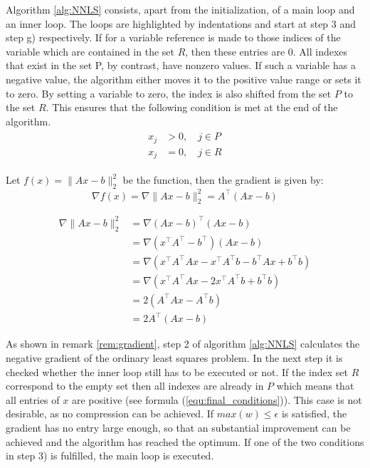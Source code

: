 Algorithm \ref{alg:NNLS} consists, apart from the initialization, of a main loop and an inner loop. The loops are highlighted by indentations and start at step 3 and step g) respectively. If for a variable reference is made to those indices of the variable which are contained in the set $R$, then these entries are 0. All indexes that exist in the set P, by contrast, have nonzero values. If such a variable has a negative value, the algorithm either moves it to the positive value range or sets it to zero. By setting a variable to zero, the index is also shifted from the set $P$ to the set $R$. This ensures that the following condition is met at the end of the algorithm.   
\begin{align}\label{equ:final_conditions}
\begin{split}
	x_j &> 0, \quad j \in P \\
	x_j &= 0, \quad j \in R
\end{split}
\end{align}



\begin{remark}\label{rem:gradient}
	Let $f(x) = \lVert Ax -b \rVert_2^2$ be the function, then the gradient is given by: 
	\begin{equation*}
		\nabla f(x) = \nabla \lVert Ax -b \rVert_2^2 = A^\top(Ax-b)
	\end{equation*}
	
	\begin{align*}
		\nabla \lVert Ax -b \rVert_2^2	&= \nabla (Ax-b)^\top (Ax-b) \\
										&= \nabla (x^\top A^\top - b^\top)(Ax-b) \\
										&= \nabla (x^\top A^\top Ax - x^\top A^\top b - b^\top Ax + b^\top b) \\
										&= \nabla (x^\top A^\top Ax - 2x^\top A^\top b + b^\top b) \\
										&= 2 (A^\top A x - A^\top b) \\
										&= 2A^\top (Ax - b)
	\end{align*}
\end{remark}

As shown in remark \ref{rem:gradient}, step 2 of algorithm \ref{alg:NNLS} calculates the negative gradient of the ordinary least squares problem. In the next step it is checked whether the inner loop still has to be executed or not. If the index set $R$ correspond to the empty set then all indexes are already in $P$ which means that all entries of $x$ are positive (see formula (\ref{equ:final_conditions})). This case is not desirable, as no compression can be achieved. If $max(w) \leq \epsilon$ is satisfied, the gradient has no entry large enough, so that an substantial improvement can be achieved and the algorithm has reached the optimum. If one of the two conditions in step 3) is fulfilled, the main loop is executed. 

